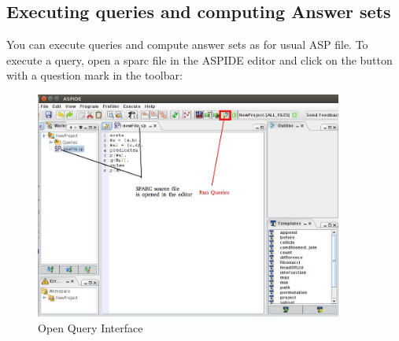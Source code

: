 \documentclass[12pt, letterpaper]{article}
\begin{document}
\subsection{Executing queries and computing Answer sets} 
You can execute queries and compute answer sets as for usual ASP file.
To execute a query, open a sparc file in the ASPIDE editor and click on the button with a question mark in the toolbar:
\begin{figure}[ht]
\centering
\includegraphics[width=0.9\textwidth]{openqueries.jpg}
\caption{Open Query Interface}
\label{fig:openqueries}
\end{figure}
\end{document}
